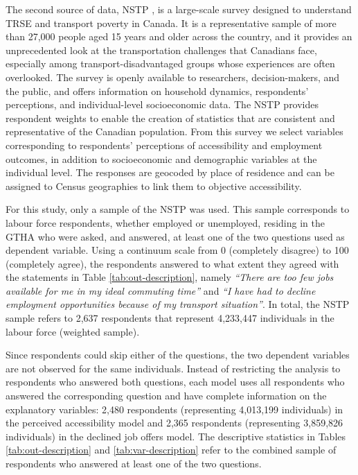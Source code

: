 \documentclass[preprint, 3p,
authoryear]{elsarticle} %
\begin{document}
The second source of data, NSTP \citep{tiznado-aitken}, is a large-scale
survey designed to understand TRSE and transport poverty in Canada. It
is a representative sample of more than 27,000 people aged 15 years and
older across the country, and it provides an unprecedented look at the
transportation challenges that Canadians face, especially among
transport-disadvantaged groups whose experiences are often overlooked.
The survey is openly available to researchers, decision-makers, and the
public, and offers information on household dynamics, respondents'
perceptions, and individual-level socioeconomic data. The NSTP provides
respondent weights to enable the creation of statistics that are
consistent and representative of the Canadian population. From this
survey we select variables corresponding to respondents' perceptions of
accessibility and employment outcomes, in addition to socioeconomic and
demographic variables at the individual level. The responses are
geocoded by place of residence and can be assigned to Census geographies
to link them to objective accessibility.

For this study, only a sample of the NSTP was used. This sample
corresponds to labour force respondents, whether employed or unemployed,
residing in the GTHA who were asked, and answered, at least one of the
two questions used as dependent variable. Using a continuum scale from 0
(completely disagree) to 100 (completely agree), the respondents
answered to what extent they agreed with the statements in Table
\ref{tab:out-description}, namely \emph{``There are too few jobs
available for me in my ideal commuting time''} and \emph{``I have had to
decline employment opportunities because of my transport situation''}.
In total, the NSTP sample refers to 2,637 respondents that represent
4,233,447 individuals in the labour force (weighted sample).

Since respondents could skip either of the questions, the two dependent
variables are not observed for the same individuals. Instead of
restricting the analysis to respondents who answered both questions,
each model uses all respondents who answered the corresponding question
and have complete information on the explanatory variables: 2,480
respondents (representing 4,013,199 individuals) in the perceived
accessibility model and 2,365 respondents (representing 3,859,826
individuals) in the declined job offers model. The descriptive
statistics in Tables \ref{tab:out-description} and
\ref{tab:var-description} refer to the combined sample of respondents
who answered at least one of the two questions.
\end{document}
